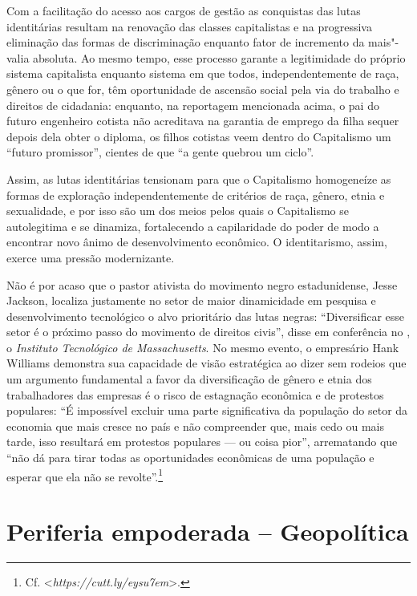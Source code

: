 Com a facilitação do acesso aos cargos de gestão as conquistas das lutas
identitárias resultam na renovação das classes capitalistas e na
progressiva eliminação das formas de discriminação enquanto fator de
incremento da mais"-valia absoluta. Ao mesmo tempo, esse processo garante
a legitimidade do próprio sistema capitalista enquanto sistema em que
todos, independentemente de raça, gênero ou o que for, têm oportunidade
de ascensão social pela via do trabalho e direitos de cidadania:
enquanto, na reportagem mencionada acima, o pai do futuro engenheiro
cotista não acreditava na garantia de emprego da filha sequer depois
dela obter o diploma, os filhos cotistas veem dentro do Capitalismo um
``futuro promissor'', cientes de que ``a gente quebrou um ciclo''.

Assim, as lutas identitárias tensionam para que o Capitalismo
homogeneíze as formas de exploração independentemente de critérios de
raça, gênero, etnia e sexualidade, e por isso são um dos meios pelos
quais o Capitalismo se autolegitima e se dinamiza, fortalecendo a
capilaridade do poder de modo a encontrar novo ânimo de desenvolvimento
econômico. O identitarismo, assim, exerce uma pressão modernizante.

Não é por acaso que o pastor ativista do movimento negro estadunidense,
Jesse Jackson, localiza justamente no setor de maior dinamicidade em
pesquisa e desenvolvimento tecnológico o alvo prioritário das lutas
negras: ``Diversificar esse setor é o próximo passo do movimento de
direitos civis'', disse em conferência no , o \emph{Instituto
Tecnológico de Massachusetts}. No mesmo evento, o empresário Hank
Williams demonstra sua capacidade de visão estratégica ao dizer sem
rodeios que um argumento fundamental a favor da diversificação de gênero
e etnia dos trabalhadores das empresas é o risco de estagnação econômica
e de protestos populares: ``É impossível excluir uma parte significativa
da população do setor da economia que mais cresce no país e não
compreender que, mais cedo ou mais tarde, isso resultará em protestos
populares --- ou coisa pior'', arrematando que ``não dá para tirar todas
as oportunidades econômicas de uma população e esperar que ela não se
revolte''.\footnote{Cf. \textless{}\emph{https://cutt.ly/eysu7em}\textgreater{}.}

\chapter{Periferia empoderada -- Geopolítica}


